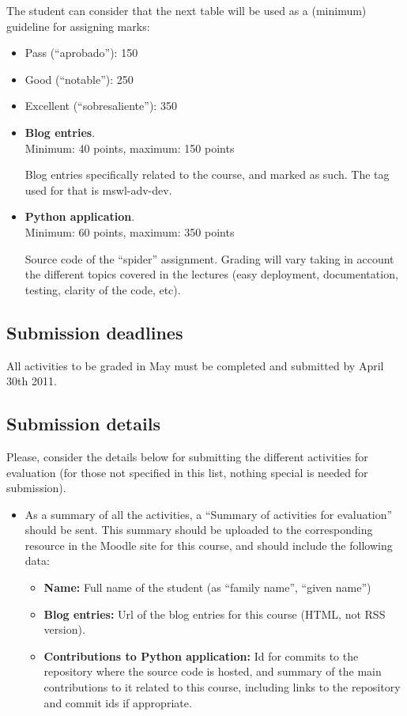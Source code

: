 \documentclass[a4paper]{article}
\begin{document}
The student can consider that the next table will be used as a
(minimum) guideline for assigning marks:

\begin{itemize}
\item Pass (``aprobado''): 150
\item Good (``notable''): 250
\item Excellent (``sobresaliente''): 350
\end{itemize}

\begin{itemize}
\item \textbf{Blog entries}. \\
  Minimum: 40 points, maximum: 150 points

  Blog entries specifically related to the course, and marked as such. The tag used for that is mswl-adv-dev.

\item \textbf{Python application}. \\
  Minimum: 60 points, maximum: 350 points

Source code of the ``spider'' assignment. Grading will vary taking in
account the different topics covered in the lectures (easy deployment,
documentation, testing, clarity of the code, etc).

\end{itemize}

\subsection{Submission deadlines}

All activities to be graded in May must be completed and submitted by April 30th 2011.

\subsection{Submission details}

Please, consider the details below for submitting the different activities for evaluation (for those not specified in this list, nothing special is needed for submission).

\begin{itemize}
\item As a summary of all the activities, a ``Summary of activities for evaluation'' should be sent. This summary should be uploaded to the corresponding resource in the Moodle site for this course, and should include the following data:
  \begin{itemize}
  \item \textbf{Name:} Full name of the student (as ``family name'', ``given name'')
  \item \textbf{Blog entries:} Url of the blog entries for this course (HTML, not RSS version).
  \item \textbf{Contributions to Python application:} Id for commits
    to the repository where the source code is hosted, and summary of the main contributions to it related to this course, including links to the repository and commit ids if appropriate.  \end{itemize}
\end{itemize}
\end{document}
